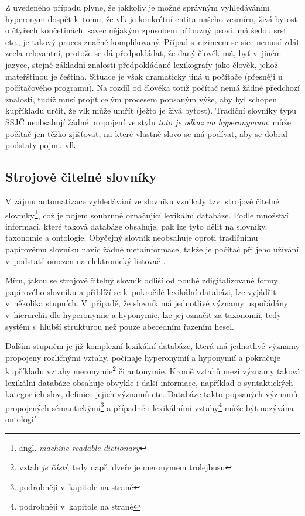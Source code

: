 \documentclass[a4paper, 11pt, oneside, showtrims]{book}
\newcommand{\itNameRef}[1]{\textit{\nameref{#1}}}
\newcommand\ex{\textsf}
\begin{document}
				Z uvedeného případu plyne, že jakkoliv je možné správným vyhledáváním hyperonym dospět k~tomu, že \ex{vlk} je konkrétní entita našeho vesmíru, živá bytost o čtyřech končetinách, savec nějakým způsobem příbuzný psovi, má šedou srst etc., je takový proces značně komplikovaný. Případ s~cizincem se sice nemusí zdát zcela relevantní, protože se dá předpokládat, že daný člověk má, byť v~jiném jazyce, stejné základní znalosti předpokládané lexikografy jako člověk, jehož mateřštinou je čeština. Situace je však dramaticky jiná u počítače (přesněji u počítačového programu). Na rozdíl od člověka totiž počítač nemá žádné předchozí znalosti, tudíž musí projít celým procesem popsaným výše, aby byl schopen kupříkladu určit, že \ex{vlk} může umřít (ježto je živá bytost). Tradiční slovníky typu SSJČ neobsahují žádné propojení ve stylu \textit{toto je odkaz na hyperonymum}, může počítač jen těžko zjišťovat, na které vlastně slovo se má podívat, aby se dobral podstaty pojmu \ex{vlk}.

				\subsection{Strojově čitelné slovníky}

					V zájmu automatizace vyhledávání ve slovníku vznikaly tzv. strojově čitelné slovníky\footnote{angl. \textit{machine readable dictionary}}, což je pojem souhrnně označující lexikální databáze. Podle množství informací, které taková databáze obsahuje, pak lze tyto dělit na slovníky, taxonomie a ontologie. Obyčejný slovník neobsahuje oproti tradičnímu papírovému slovníku navíc žádné metainformace, takže je počítač při jeho užívání v~podstatě omezen na elektronický listovač \parencite{miller1990introduction}. 

					Míru, jakou se strojově čitelný slovník odliší od pouhé zdigitalizované formy papírového slovníku a přiblíží se k~pokročilé lexikální databázi, lze vyjádřit v~několika stupních. V~případě, že slovník má jednotlivé významy uspořádány v~hierarchii dle hyperonymie a hyponymie, lze jej označit za taxonomii, tedy systém s~hlubší strukturou než pouze abecedním řazením hesel. 

					Dalším stupněm je již komplexní lexikální databáze, která má jednotlivé významy propojeny rozličnými vztahy, počínaje hyperonymií a hyponymií a pokračuje kupříkladu vztahy meronymie\footnote{vztah \textit{je částí}, tedy např. \ex{dveře} je meronymem \ex{trolejbusu}} či antonymie. Kromě vztahů mezi významy taková lexikální databáze obsahuje obvykle i další informace, například o syntaktických kategoriích slov, definice jejich významů etc. Databáze takto popsaných významů propojených sémantickými\footnote{podrobněji v~kapitole \itNameRef{cha:sem-vztahy} na straně \pageref{cha:sem-vztahy}} a případně i lexikálními vztahy\footnote{podrobněji v~kapitole \itNameRef{cha:lexvztah} na straně \pageref{cha:lexvztah}} může být nazývána ontologií. \parencite{garshol2004metadata}
\end{document}
